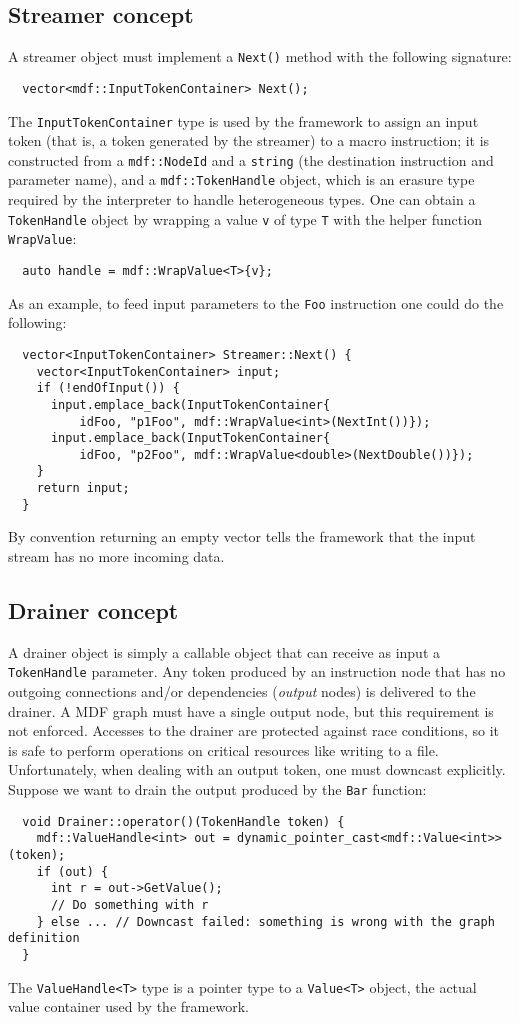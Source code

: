 \documentclass[a4paper, 11pt, oneside]{article}
\begin{document}
\subsection{Streamer concept}
 
A streamer object must implement a \texttt{Next()} method with the following signature:
\begin{verbatim}
  vector<mdf::InputTokenContainer> Next();
\end{verbatim}
The \texttt{InputTokenContainer} type is used by the framework to assign an input token (that is, a token generated by the streamer) to a macro instruction; it is constructed from a \texttt{mdf::NodeId} and a \texttt{string} (the destination instruction and parameter name), and a \texttt{mdf::TokenHandle} object, which is an erasure type required by the interpreter to handle heterogeneous types. One can obtain a \texttt{TokenHandle} object by wrapping a value \texttt{v} of type \texttt{T} with the helper function \texttt{WrapValue}:
\begin{verbatim}
  auto handle = mdf::WrapValue<T>{v};
\end{verbatim}
As an example, to feed input parameters to the \texttt{Foo} instruction one could do the following:
\begin{verbatim}
  vector<InputTokenContainer> Streamer::Next() {
    vector<InputTokenContainer> input;
    if (!endOfInput()) {
      input.emplace_back(InputTokenContainer{
          idFoo, "p1Foo", mdf::WrapValue<int>(NextInt())});
      input.emplace_back(InputTokenContainer{
          idFoo, "p2Foo", mdf::WrapValue<double>(NextDouble())});
    }
    return input;
  }
\end{verbatim}
By convention returning an empty vector tells the framework that the input stream has no more incoming data.

\subsection{Drainer concept}

A drainer object is simply a callable object that can receive as input a \texttt{TokenHandle} parameter. Any token produced by an instruction node that has no outgoing connections and/or dependencies (\emph{output} nodes) is delivered to the drainer. A MDF graph must have a single output node, but this requirement is not enforced. Accesses to the drainer are protected against race conditions, so it is safe to perform operations on critical resources like writing to a file. Unfortunately, when dealing with an output token, one must downcast explicitly. Suppose we want to drain the output produced by the \texttt{Bar} function:
\begin{verbatim}
  void Drainer::operator()(TokenHandle token) {
    mdf::ValueHandle<int> out = dynamic_pointer_cast<mdf::Value<int>>(token);
    if (out) { 
      int r = out->GetValue();
      // Do something with r
    } else ... // Downcast failed: something is wrong with the graph definition
  }
\end{verbatim}
The \texttt{ValueHandle<T>} type is a pointer type to a \texttt{Value<T>} object, the actual  value container used by the framework.
\end{document}
